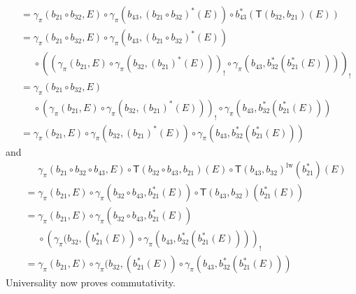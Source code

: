 \begin{enumerate}
\begin{enumerate}
\begin{align*}
  &=
  \gamma_{\pi}(b_{21} \circ b_{32},E)
  \circ
  \gamma_{\pi}
  \left(
    b_{43},
    (b_{21} \circ b_{32})^{\ast}(E)
  \right)
  \circ
  b_{43}^{\ast}
  \left(
    \mathsf{T}(b_{32},b_{21})(E)
  \right)
  \\
  &=
  \gamma_{\pi}(b_{21} \circ b_{32},E)
  \circ
  \gamma_{\pi}
  \left(
    b_{43},
    (b_{21} \circ b_{32})^{\ast}(E)
  \right)
  \\
  &\phantom{=}
  \circ
  \left(
    \left(
      \gamma_{\pi}(b_{21},E)
      \circ
      \gamma_{\pi}
      \left(
        b_{32},
        (b_{21})^{\ast}(E)
      \right)
    \right)_{!}
    \circ
    \gamma_{\pi}
    \left(
      b_{43},
      b_{32}^{\ast}
      \left(
        b_{21}^{\ast}(E)
      \right)
    \right)
  \right)_{!}
  \\
  &=
  \gamma_{\pi}(b_{21} \circ b_{32},E)
  \\
  &\phantom{=}
  \circ
  \left(
    \gamma_{\pi}(b_{21},E)
    \circ
    \gamma_{\pi}
    \left(
      b_{32},
      (b_{21})^{\ast}(E)
    \right)
  \right)_{!}
  \circ
  \gamma_{\pi}
  \left(
    b_{43},
    b_{32}^{\ast}
    \left(
      b_{21}^{\ast}(E)
    \right)
  \right)
  \\
  &=
  \gamma_{\pi}(b_{21},E)
  \circ
  \gamma_{\pi}
  \left(
    b_{32},
    (b_{21})^{\ast}(E)
  \right)
  \circ
  \gamma_{\pi}
  \left(
    b_{43},
    b_{32}^{\ast}
    \left(
      b_{21}^{\ast}(E)
    \right)
  \right)
\end{align*}
and
\begin{align*}
  &\phantom{=}
  \gamma_{\pi}(b_{21} \circ b_{32} \circ b_{43},E)
  \circ
  \mathsf{T}(b_{32} \circ b_{43},b_{21})(E)
  \circ
  \mathsf{T}(b_{43},b_{32})^{\mathrm{lw}}(b_{21}^{\ast})
  (E)
  \\
  &=
  \gamma_{\pi}(b_{21},E)
  \circ
  \gamma_{\pi}
  \left(
    b_{32}
    \circ
    b_{43},
    b_{21}^{\ast}(E)
  \right)
  \circ
  \mathsf{T}(b_{43},b_{32})(b_{21}^{\ast}(E))
  \\
  &=
  \gamma_{\pi}(b_{21},E)
  \circ
  \gamma_{\pi}
  \left(
    b_{32}
    \circ
    b_{43},
    b_{21}^{\ast}(E)
  \right)
  \\
  &\phantom{=}
  \circ
  \left(
    \gamma_{\pi}(b_{32},(b_{21}^{\ast}(E))
    \circ
    \gamma_{\pi}
    \left(
      b_{43},
      b_{32}^{\ast}
      \left(
        b_{21}^{\ast}(E)
      \right)
    \right)
  \right)_{!}
  \\
  &=
  \gamma_{\pi}(b_{21},E)
  \circ
  \gamma_{\pi}(b_{32},(b_{21}^{\ast}(E))
  \circ
  \gamma_{\pi}
  \left(
    b_{43},
    b_{32}^{\ast}
    \left(
      b_{21}^{\ast}(E)
    \right)
  \right)
\end{align*}
Universality now proves commutativity.
\end{enumerate}
\end{enumerate}
